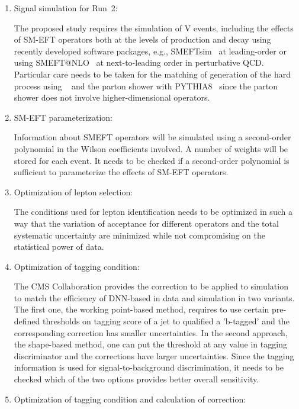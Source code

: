 \documentclass[a4paper,11pt]{article}
\newcommand{\Pb}{{{\Pqb}}\xspace}
\renewcommand{\PV}{{{{V}}}\xspace}
\newcommand{\VH}{{{\PV}{\PH}}\xspace}
\begin{document}
{\begin{enumerate}
\item Signal simulation for Run~2:

The proposed study requires the simulation of \VH events, including the effects of SM-EFT operators both at the levels of production and decay using recently developed software packages, e.g., SMEFTsim~\cite{Brivio:2020onw} at leading-order or using SMEFT@NLO~\cite{Degrande:2020evl} at next-to-leading order in perturbative QCD. 
Particular care needs to be taken for the matching of generation of the hard process using {\MGvATNLO}~\cite{Alwall:2014hca} and the parton shower with PYTHIA8~\cite{Sjostrand:2014zea} 
since the parton shower does not involve higher-dimensional operators. 

\item SM-EFT parameterization:

Information about SMEFT operators will be simulated using a second-order polynomial in the Wilson coefficients involved. A number of weights will be stored for each event. 
It needs to be checked if a second-order polynomial is sufficient to parameterize the effects of SM-EFT operators.

\item Optimization of lepton selection:

The conditions used for lepton identification needs to be optimized in such a way that the variation of acceptance for different operators and the total systematic uncertainty are minimized while not compromising on the statistical power of data. 

\item Optimization of \Pb tagging condition: 

The CMS Collaboration provides the correction to be applied to simulation to match the efficiency of DNN-based \Pb in data and simulation in two variants. 
The first one, the working point-based method, requires to use certain pre-defined thresholds on \Pb tagging score of a jet to qualified a 'b-tagged' and the corresponding correction has smaller uncertainties. 
In the second approach, the shape-based method, one can put the threshold at any value in \Pb tagging discriminator and the corrections have larger uncertainties. Since the \Pb tagging information is used for signal-to-background discrimination, it needs to be checked which of the two options provides better overall sensitivity.  

\item Optimization of \PH tagging condition and calculation of correction:


\end{enumerate}}
\end{document}
